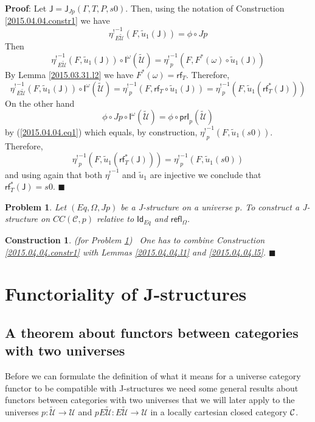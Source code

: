 \documentclass[12pt]{article}
\numberwithin{equation}{section}
\newenvironment{myproof}{{\bf Proof}:}{$\blacksquare$ \vskip 5mm }
\newtheorem{problem}[proposition]{Problem}
\newtheorem{construction0}[proposition]{Construction}
\newenvironment{construction}[1]{\begin{construction0}(for Problem \ref{#1})\ }{$\blacksquare$ \end{construction0}}
\newcommand{\sr}{\rightarrow}
\newcommand{\wt}{\widetilde}
\newcommand{\toCC}{CC} %
\newcommand{\C}{{\mathcal C}}  %
\newcommand{\Id}{\mathsf{Id}} %
\newcommand{\refl}{\mathsf{refl}}
\newcommand{\J}{\mathsf{J}}
\newcommand{\U}{\mathcal{U}}
\newcommand{\I}{\mathsf{I}}
\newcommand{\rf}{\mathsf{rf}}
\newcommand{\etashriek}{\eta^!}
\newcommand{\etaunshriek}{{\etashriek}^{-1}}
\newcommand{\prI}{\mathsf{prI}}
\begin{document}
%
\begin{myproof}
Let $\J=\J_{Jp}(\Gamma,T,P,s0)$. Then, using the notation of Construction
\ref{2015.04.04.constr1} we have
%
$$\etaunshriek_{E\wt{\U}}(F,\wt{u}_1(\J))=\phi\circ Jp$$
%
Then
%
$$\etaunshriek_{E\wt{\U}}(F,\wt{u}_1(\J))\circ
\I^{\omega}(\wt{\U})=\etaunshriek_p(F,F^*(\omega)\circ \wt{u}_1(\J))$$
%
By Lemma \ref{2015.03.31.l2} we have $F^*(\omega)=\rf_T$. Therefore,
%
$$\etaunshriek_{E\wt{\U}}(F,\wt{u}_1(\J))\circ \I^{\omega}(\wt{\U})=\etaunshriek_p(F,\rf_T\circ
\wt{u}_1(\J))=\etaunshriek_p(F,\wt{u}_1(\rf_T^*(\J)))$$
%
On the other hand
%
$$\phi\circ Jp\circ \I^{\omega}(\wt{\U})=\phi\circ \prI_p(\wt{\U})$$
%
by (\ref{2015.04.04.eq1}) which equals, by construction,
$\etaunshriek_p(F,\wt{u}_1(s0))$. Therefore,
%
$$\etaunshriek_p(F,\wt{u}_1(\rf_T^*(\J)))=\etaunshriek_p(F,\wt{u}_1(s0))$$
%
and using again that both $\etaunshriek$ and $\wt{u}_1$ are injective we conclude that
$\rf_T^*(\J)=s0$.
\end{myproof}
%
\begin{problem}
\label{2015.04.04.prob2} Let $(Eq,\Omega,Jp)$ be a J-structure on a universe
$p$. To construct a J-structure on $\toCC({\C},p)$ relative to $\Id_{Eq}$
and $\refl_{\Omega}$.
\end{problem} 
%
\begin{construction}{2015.04.04.prob2}\rm
\label{2015.04.04.constr2} One has to combine Construction
\ref{2015.04.04.constr1} with Lemmas \ref{2015.04.04.l1} and
\ref{2015.04.04.l5}.
\end{construction}
%





\section{Functoriality of J-structures}




\subsection{A theorem about functors between categories with two universes}
\label{twouniv}
%
Before we can formulate the definition of what it means for a universe category
functor to be compatible with J-structures we need some general results about
functors between categories with two universes that we will later apply to the
universes $p:\wt{\U}\sr \U$ and $pE\wt{\U}:E\wt{\U}\sr \U$ in a locally cartesian
closed category $\cal C$.
\end{document}
